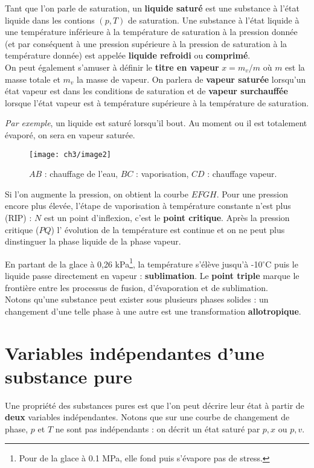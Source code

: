 Tant que l'on parle de saturation, un \textbf{liquide saturé} est une 
substance à l'état liquide dans les contions $(p,T)$ de saturation. 
Une substance à l’état liquide à une température inférieure à la 
température de saturation à la pression donnée (et par conséquent à 
une pression supérieure à la pression de saturation à la température 
donnée) est appelée \textbf{liquide refroidi} ou \textbf{comprimé}.\\

\noindent
On peut également s'amuser à définir le \textbf{titre en vapeur} $
x = m_v/m$ où $m$ est la masse totale et $m_v$ la masse de vapeur. On 
parlera de \textbf{vapeur saturée} lorsqu'un état vapeur est dans les 
conditions de saturation et de \textbf{vapeur surchauffée} lorsque 
l'état vapeur est à température supérieure à la température de 
saturation.


\textit{Par exemple}, un liquide est saturé lorsqu'il bout. Au moment 
ou il est totalement évaporé, on sera en vapeur saturée.


\begin{figure}[H]
	\centering
	\texttt{[image: ch3/image2]}
	\caption{$AB$ : chauffage de l'eau, $BC$ : vaporisation, $CD$ : chauffage 
	vapeur.}
\end{figure}

Si l'on augmente la pression, on obtient la courbe $EFGH$. Pour une 
pression encore plus élevée, l'étape de vaporisation à température 
constante n'est plus (RIP) : $N$ est un point d'inflexion, c'est le 
\textbf{point critique}. Après la pression critique ($PQ$) l'
évolution de la température est continue et on ne peut plus 
dinstinguer la phase liquide de la phase vapeur. 

En partant de la glace à 0,26 kPa\footnote{Pour de la glace à 0.1 MPa, 
elle fond puis s'évapore pas de stress.}, la température s'élève jusqu'à 
-10$^\circ$C puis le liquide passe directement en vapeur : \textbf{
	sublimation}. Le \textbf{point triple} marque le frontière entre 
les processus de fusion, d'évaporation et de sublimation.\\

\noindent
Notons qu'une substance peut exister sous plusieurs phases solides : 
un changement d'une telle phase à une autre est une transformation 
\textbf{allotropique}.

\section{Variables indépendantes d'une substance pure}
Une propriété des substances pures est que l'on peut décrire leur 
état à partir de \textbf{deux} variables indépendantes. Notons que
sur une courbe de changement de phase, $p$ et $T$ ne sont pas 
indépendants : on décrit un état saturé par $p,x$ ou $p,v$.


